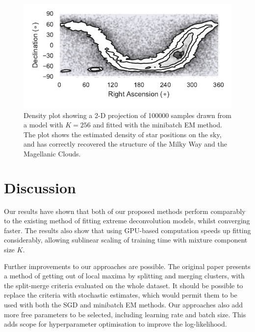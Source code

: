 \documentclass{article}
\begin{document}
\begin{figure}
  \centering
  \includegraphics{figures/density.pdf}
  \caption{Density plot showing a 2-D projection of 100000 samples drawn from a model with $K=256$ and fitted with the minibatch EM method.
  The plot shows the estimated density of star positions on the sky, and has correctly recovered the structure of the Milky Way and the Magellanic Clouds.}
  \label{fig:projection}
\end{figure}

\section{Discussion}

Our results have shown that both of our proposed methods perform comparably to the existing method of fitting extreme deconvolution models, whilst converging faster.
The results also show that using GPU-based computation speeds up fitting considerably, allowing sublinear scaling of training time with mixture component size $K$.

Further improvements to our approaches are possible.
The original paper presents a method of getting out of local maxima by splitting and merging clusters, with the split-merge criteria evaluated on the whole dataset.
It should be possible to replace the criteria with stochastic estimates, which would permit them to be used with both the SGD and minibatch EM methods.
Our approaches also add more free parameters to be selected, including learning rate and batch size.
This adds scope for hyperparameter optimisation to improve the log-likelihood.
\end{document}
